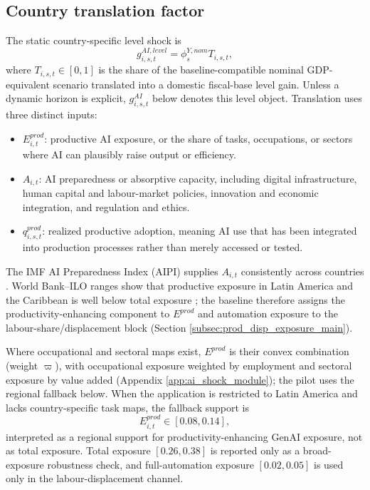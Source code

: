 \documentclass[11pt,a4paper]{article}
\begin{document}
\subsection{Country translation factor}\label{subsec:translation_factor_main}

The static country-specific level shock is
\begin{equation}
    g^{AI,level}_{i,s,t}=\phi^{Y,nom}_s T_{i,s,t},
\end{equation}
where $T_{i,s,t}\in[0,1]$ is the share of the baseline-compatible nominal GDP-equivalent scenario translated into a domestic fiscal-base level gain. Unless a dynamic horizon is explicit, $g^{AI}_{i,s,t}$ below denotes this level object. Translation uses three distinct inputs:
\begin{itemize}
    \item $E^{prod}_{i,t}$: productive AI exposure, or the share of tasks, occupations, or sectors where AI can plausibly raise output or efficiency.
    \item $A_{i,t}$: AI preparedness or absorptive capacity, including digital infrastructure, human capital and labour-market policies, innovation and economic integration, and regulation and ethics.
    \item $q^{prod}_{i,s,t}$: realized productive adoption, meaning AI use that has been integrated into production processes rather than merely accessed or tested.
\end{itemize}
The IMF AI Preparedness Index (AIPI) supplies $A_{i,t}$ consistently across countries \citep{imf2024aipi,cazzaniga2024genai}. World Bank--ILO ranges show that productive exposure in Latin America and the Caribbean is well below total exposure \citep{worldbankilo2024lacgenai}; the baseline therefore assigns the productivity-enhancing component to $E^{prod}$ and automation exposure to the labour-share/displacement block (Section \ref{subsec:prod_disp_exposure_main}).

Where occupational and sectoral maps exist, $E^{prod}$ is their convex combination (weight $\varpi$), with occupational exposure weighted by employment and sectoral exposure by value added (Appendix \ref{app:ai_shock_module}); the pilot uses the regional fallback below.
When the application is restricted to Latin America and lacks country-specific task maps, the fallback support is
\begin{equation}
    E^{prod}_{i,t}\in[0.08,0.14],
\end{equation}
interpreted as a regional support for productivity-enhancing GenAI exposure, not as total exposure. Total exposure $[0.26,0.38]$ is reported only as a broad-exposure robustness check, and full-automation exposure $[0.02,0.05]$ is used only in the labour-displacement channel.
\end{document}
